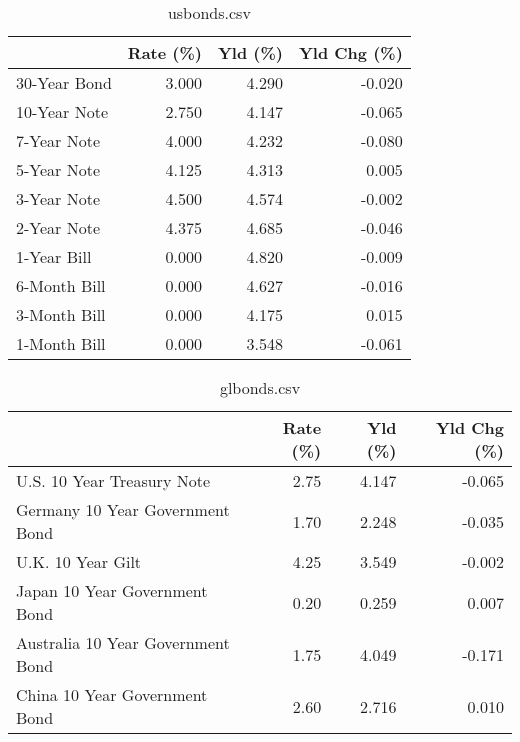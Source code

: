 \documentclass{article}%
\begin{document}
%


\begin{table}[htbp]%
\caption{usbonds.csv}%
\centering%
\begin{adjustbox}{width=1\textwidth}%
\begin{tabular}{lrrr}
\toprule
             &  Rate (\%) &  Yld (\%) &  Yld Chg (\%) \\
\midrule
30-Year Bond &     3.000 &    4.290 &       -0.020 \\
10-Year Note &     2.750 &    4.147 &       -0.065 \\
 7-Year Note &     4.000 &    4.232 &       -0.080 \\
 5-Year Note &     4.125 &    4.313 &        0.005 \\
 3-Year Note &     4.500 &    4.574 &       -0.002 \\
 2-Year Note &     4.375 &    4.685 &       -0.046 \\
 1-Year Bill &     0.000 &    4.820 &       -0.009 \\
6-Month Bill &     0.000 &    4.627 &       -0.016 \\
3-Month Bill &     0.000 &    4.175 &        0.015 \\
1-Month Bill &     0.000 &    3.548 &       -0.061 \\
\bottomrule
\end{tabular}
%
\end{adjustbox}%
\end{table}

%


\begin{table}[htbp]%
\caption{glbonds.csv}%
\centering%
\begin{adjustbox}{width=1\textwidth}%
\begin{tabular}{lrrr}
\toprule
                                  &  Rate (\%) &  Yld (\%) &  Yld Chg (\%) \\
\midrule
       U.S. 10 Year Treasury Note &      2.75 &    4.147 &       -0.065 \\
  Germany 10 Year Government Bond &      1.70 &    2.248 &       -0.035 \\
                U.K. 10 Year Gilt &      4.25 &    3.549 &       -0.002 \\
    Japan 10 Year Government Bond &      0.20 &    0.259 &        0.007 \\
Australia 10 Year Government Bond &      1.75 &    4.049 &       -0.171 \\
    China 10 Year Government Bond &      2.60 &    2.716 &        0.010 \\
\bottomrule
\end{tabular}
%
\end{adjustbox}%
\end{table}
\end{document}
